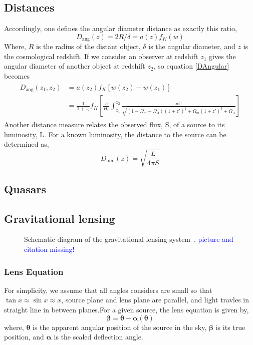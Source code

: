   \subsection{Distances}
  Accordingly, one defines the angular diameter distance as exactly this ratio,
  \begin{equation}
  	D_\text{ang}(z)=2R/\delta=a(z)f_{K}(w)
  \label{DAngular}
  \end{equation}
  \noindent
  Where, $R$ is the radius of the distant object, $\delta$ is the angular diameter, and $z$ is the cosmological redshift. If we consider an observer at redshift $ z_{1} $ gives the angular diameter of another object at redshift $ z_{2} $, so equation \ref{DAngular} becomes
  \begin{align}
	  \begin{split}
	  D_\text{ang}(z_{1},z_{2}) &=a(z_{2})f_{K}[w(z_{2}) - w(z_{1})] \\
										 &= \frac{1}{1+z_2} f_{K} \left[ \frac{c}{H_0} \int_{z_1}^{z_2} \frac{\dd{z'}}{\sqrt{(1-\Omega_\text{m}-\Omega_\Lambda)(1+z')^2 + \Omega_\text{m}(1+z')^3+\Omega_\Lambda}} \right]					
	  \end{split}
  \label{math:Dangular2}
  \end{align}
  Another distance measure relates the observed flux, S, of a source to its luminosity, L. For a known luminosity, the distance to the source can be determined as,
  \begin{equation}
  D_\text{lum}(z)=\sqrt{\frac{L}{4\pi S}}
  \end{equation}
  
  \subsection{Quasars}
  
  \subsection{Gravitational lensing}
  
  \begin{figure}[ht]
  	\centering
   \caption{Schematic diagram of the gravitational lensing system~\cite{wiki}. \textcolor{blue}{picture and citation missing!}}%
  	\label{fig:lensing}
  \end{figure}
  
\subsubsection{Lens Equation}
For simplicity, we assume that all angles considers are small so that $\tan x \approx \sin x \approx x$, source plane and lens plane are parallel, and light travles in straight line in between planes.For a given source, the lens equation is given by,
\begin{equation}
\pmb\beta = \pmb\theta - \pmb\alpha (\pmb\theta)
\label{LEquation}
\end{equation}
\noindent
where, $\pmb\theta$ is the apparent angular position of the source in the sky, $\pmb\beta$ is its true position, and $\pmb\alpha $ is the scaled deflection angle.


